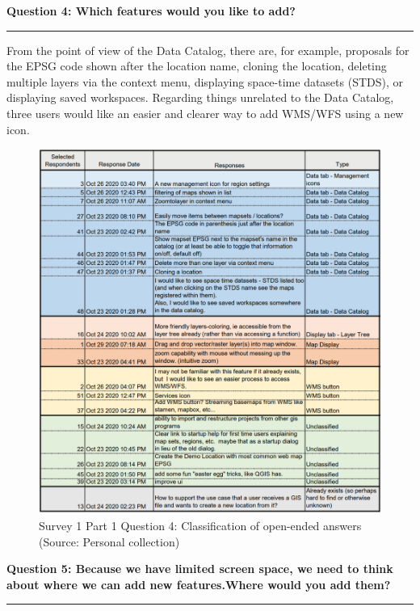 \documentclass[a4paper,10pt,twoside]{article}
\begin{document}
\newpage
\noindent \textbf{Question 4: Which features would you like to add?}
\par\noindent\rule{\textwidth}{0.4pt}

\noindent From the point of view of the Data Catalog, there are, for example, proposals for the EPSG code shown after the location name, cloning the location, deleting multiple layers via the context menu, displaying space-time datasets (STDS), or displaying saved workspaces. Regarding things unrelated to the Data Catalog, three users would like an easier and clearer way to add WMS/WFS using a new icon.

\begin{figure}[hbt!] 
\begin{center}
\includegraphics[width=15.5cm]{../surveys/analyzed_data/survey1_part1_question4_open_ended.png} 
\caption[Survey 1 Part 1 Question 4: Classification of open-ended answers]{Survey 1 Part 1 Question 4: Classification of open-ended answers (Source: Personal collection)}
\label{fig:survey1_part1_question4_open_ended}
\end{center}
\end{figure}

\newpage
\noindent \textbf{Question 5: Because we have limited screen space, we need to think about where we can add new features.Where would you add them?}
\par\noindent\rule{\textwidth}{0.4pt}
\end{document}

